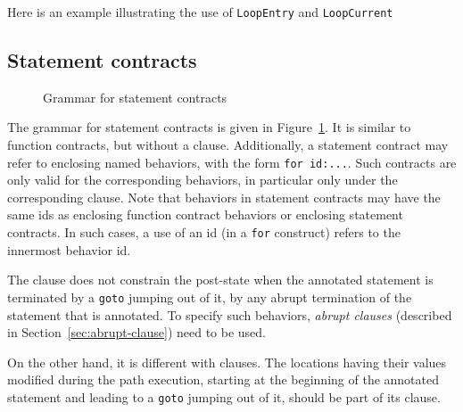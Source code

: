 \begin{example}
Here is an example illustrating the use of \lstinline|LoopEntry| and
\lstinline|LoopCurrent|

\end{example}

\subsection{Statement contracts}
\label{sec:statement_contract}
\begin{figure}[t]
  \begin{cadre}
    
  \end{cadre}
  \caption{Grammar for statement contracts}
  \label{fig:gram:stcontracts}
\end{figure}

The grammar for statement contracts is given in
Figure~\ref{fig:gram:stcontracts}. It is similar to function
contracts, but without a \decreases{} clause. Additionally, a statement contract
may refer to enclosing named behaviors, with the form
\lstinline|for id:...|.
Such contracts are only valid for the
corresponding behaviors, in particular only under the
corresponding \assumes{} clause.
Note that behaviors in statement contracts may have the same ids as enclosing function contract behaviors
or enclosing statement contracts.
In such cases, a use of an id (in a \lstinline|for| construct) refers to the innermost behavior id.


The \ensures{} clause does not constrain the
post-state when the annotated statement is terminated 
by a \lstinline|goto| jumping out of it,
by any abrupt termination of the statement that is annotated.
To specify such behaviors, \textsl{abrupt clauses} (described in
Section~\ref{sec:abrupt-clause}) need to be used.

On the other hand, it is different with \assigns{} clauses.
The locations having their values modified during the path execution, starting
at the beginning of the annotated statement and leading
to a \lstinline|goto| jumping out of it, should be part of its 
\assigns clause.

